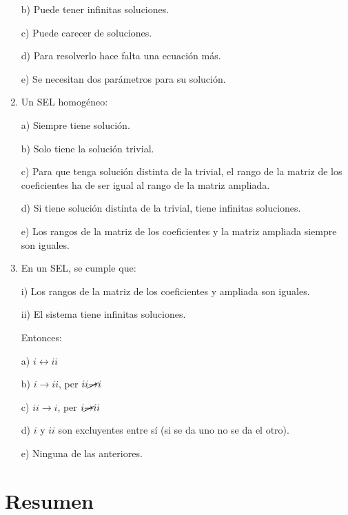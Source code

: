 \begin{enumerate}[Q1. ]
b) Puede tener infinitas soluciones.

c) Puede carecer de soluciones.

d) Para resolverlo hace falta una ecuación más.

e) Se necesitan dos parámetros para su solución.


\item Un SEL homogéneo:

a) Siempre tiene solución.

b) Solo tiene la solución trivial.

c) Para que tenga solución distinta de la trivial, el rango de la matriz de los coeficientes ha de ser igual al rango de la matriz ampliada.

d) Si tiene solución distinta de la trivial, tiene infinitas soluciones.

e) Los rangos de la matriz de los coeficientes y la matriz ampliada siempre son iguales.


\item En un SEL, se cumple que:

i) Los rangos de la matriz de los coeficientes y ampliada son iguales.

ii) El sistema tiene infinitas soluciones.

Entonces:

a) $i \leftrightarrow ii$

b) $i \to ii$, per $ii \cancel{\to} i$

c)  $ii \to i$, per $i \cancel{\to} ii$

d) $i$ y $ii$ son excluyentes entre sí (si se da uno no se da el otro).

e) Ninguna de las anteriores.



\end{enumerate}


\clearpage

\section{Resumen}


